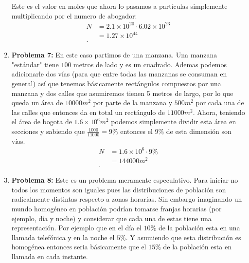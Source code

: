 \documentclass[12pt]{exam}
\begin{document}
\begin{enumerate}
    Este es el valor en moles que ahora lo pasamos a partículas simplemente multiplicando por el numero de abogador:
    \begin{align*}
      N &= 2.1\times 10^{20}\cdot 6.02\times 10^{23} \\
      &= 1.27\times 10^{44} \\
    .\end{align*}
  \item \textbf{Problema 7:}
    En este caso partimos de una manzana. Una manzana "estándar" tiene $100$ metros de lado y es un cuadrado. Ademas podemos adicionarle dos vías (para que entre todas las manzanas se consuman en general) así que tenemos básicamente rectángulos compuestos por una manzana y dos calles que asumiremos tienen 5 metros de largo, por lo que queda un área de $10000 m^{2}$ por parte de la manzana y $500 m^2$ por cada una de las calles que entonces da en total un rectángulo de $11000 m^2$. Ahora, teniendo el área de bogota de $1.6\times 10^{6} m^2$ podemos simplemente dividir esta área en secciones y sabiendo que $\frac{1000}{11000}=9\%$ entonces el $9\%$ de esta dimensión son vías.
    \begin{align*}
      N &= 1.6\times 10^{6}\cdot 9\% \\
      &= 144000 m^2 \\
    .\end{align*}
  \item \textbf{Problema 8:} Este es un problema meramente especulativo. Para iniciar no todos los momentos son iguales pues las distribuciones de población son radicalmente distintas respecto a zonas horarias. Sin embargo imaginando un mundo homogéneo en población podrían tomarse franjas horarias (por ejemplo, día y noche) y considerar que cada una de estas tiene una representación. Por ejemplo que en el día el $10\%$ de la población esta en una llamada telefónica y en la noche el $5\%$. Y asumiendo que esta distribución es homogénea entonces seria básicamente que el  $15\%$ de la población esta en llamada en cada instante. 
\end{enumerate}
\end{document}
